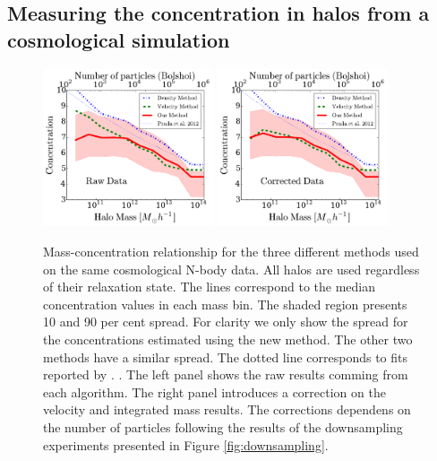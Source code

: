 \documentclass[a4,useAMS,usenatbib,usegraphicx]{mn2e}
\begin{document}
\subsection{Measuring the concentration in halos from a cosmological simulation}


\begin{figure}
\begin{center}
  \includegraphics[width=0.45\textwidth]{concentration_bolshoi.pdf}
  \includegraphics[width=0.45\textwidth]{concentration_bolshoi_corrected.pdf}
\end{center}
\vspace{-0.5cm}
\caption{Mass-concentration relationship for the three different
  methods used on the same cosmological N-body data. 
  All halos are used regardless of their relaxation state.
  The lines correspond to the median concentration values in each mass bin.
  The shaded region presents 10 and 90 per cent spread.
  For clarity we only show the spread for the concentrations estimated
  using the new method. The other two methods have a similar spread. The
  dotted line corresponds to fits reported by \citep{Prada2012}.
  \label{fig:concentration}. The left panel shows the raw results
  comming from each algorithm. The right panel introduces a
  correction on the velocity and integrated mass results. 
  The corrections dependens on the number of particles following the
  results of the downsampling experiments presented in Figure
  \ref{fig:downsampling}.} 
\end{figure}
\end{document}
